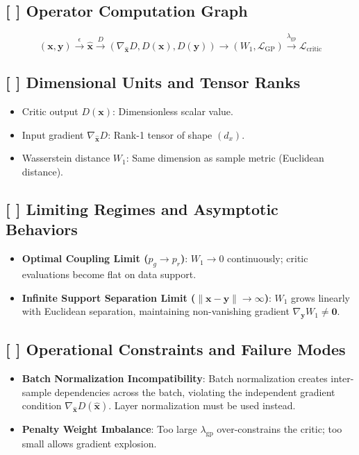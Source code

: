 \documentclass[11pt,a4paper]{article}
\theoremstyle{definition}
\begin{document}
\subsection{[ ] Operator Computation Graph}
{\boldmath
\begin{equation}
(\mathbf{x}, \mathbf{y}) \xrightarrow{\epsilon} \hat{\mathbf{x}} \xrightarrow{D} (\nabla_{\hat{\mathbf{x}}} D, D(\mathbf{x}), D(\mathbf{y})) \longrightarrow (W_1, \mathcal{L}_{\text{GP}}) \xrightarrow{\lambda_{\text{gp}}} \mathcal{L}_{\text{critic}}
\end{equation}
}

\subsection{[ ] Dimensional Units and Tensor Ranks}
\begin{itemize}
    \item Critic output $D(\mathbf{x})$: Dimensionless scalar value.
    \item Input gradient $\nabla_{\hat{\mathbf{x}}} D$: Rank-1 tensor of shape $(d_x)$.
    \item Wasserstein distance $W_1$: Same dimension as sample metric (Euclidean distance).
\end{itemize}

\subsection{[ ] Limiting Regimes and Asymptotic Behaviors}
\begin{itemize}
    \item \textbf{Optimal Coupling Limit ($p_g \to p_r$)}: $W_1 \to 0$ continuously; critic evaluations become flat on data support.
    \item \textbf{Infinite Support Separation Limit ($\|\mathbf{x} - \mathbf{y}\| \to \infty$)}: $W_1$ grows linearly with Euclidean separation, maintaining non-vanishing gradient $\nabla_{\mathbf{y}} W_1 \ne \mathbf{0}$.
\end{itemize}

\subsection{[ ] Operational Constraints and Failure Modes}
\begin{itemize}
    \item \textbf{Batch Normalization Incompatibility}: Batch normalization creates inter-sample dependencies across the batch, violating the independent gradient condition $\nabla_{\hat{\mathbf{x}}} D(\hat{\mathbf{x}})$. Layer normalization must be used instead.
    \item \textbf{Penalty Weight Imbalance}: Too large $\lambda_{\text{gp}}$ over-constrains the critic; too small allows gradient explosion.
\end{itemize}
\end{document}
